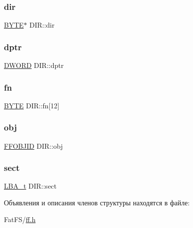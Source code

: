 \mbox{\label{struct_d_i_r_a6c2a8c0cf2d55ae99775e93a16593449}} 
\subsubsection{\texorpdfstring{dir}{dir}}
{\footnotesize\ttfamily \mbox{\hyperlink{ff_8h_a4ae1dab0fb4b072a66584546209e7d58}{B\+Y\+TE}}$\ast$ D\+I\+R\+::dir}

\mbox{\label{struct_d_i_r_a0330e9554e1f38795debe4495156873e}} 
\subsubsection{\texorpdfstring{dptr}{dptr}}
{\footnotesize\ttfamily \mbox{\hyperlink{ff_8h_ad342ac907eb044443153a22f964bf0af}{D\+W\+O\+RD}} D\+I\+R\+::dptr}

\mbox{\label{struct_d_i_r_ad90d974c0e7640307598c586bf141b32}} 
\subsubsection{\texorpdfstring{fn}{fn}}
{\footnotesize\ttfamily \mbox{\hyperlink{ff_8h_a4ae1dab0fb4b072a66584546209e7d58}{B\+Y\+TE}} D\+I\+R\+::fn\mbox{[}12\mbox{]}}

\mbox{\label{struct_d_i_r_a8fa2dfd8198410ea92a98281d982cf44}} 
\subsubsection{\texorpdfstring{obj}{obj}}
{\footnotesize\ttfamily \mbox{\hyperlink{struct_f_f_o_b_j_i_d}{F\+F\+O\+B\+J\+ID}} D\+I\+R\+::obj}

\mbox{\label{struct_d_i_r_ae76119034beae8f34eb1536d0ef83a40}} 
\subsubsection{\texorpdfstring{sect}{sect}}
{\footnotesize\ttfamily \mbox{\hyperlink{ff_8h_a1f3c30a83148a28340f009d4e583f087}{L\+B\+A\+\_\+t}} D\+I\+R\+::sect}



Объявления и описания членов структуры находятся в файле\+:\begin{DoxyCompactItemize}
\item 
Fat\+F\+S/\mbox{\hyperlink{ff_8h}{ff.\+h}}\end{DoxyCompactItemize}
